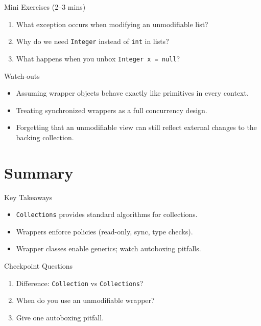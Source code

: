 \documentclass{beamer}
\begin{document}
\begin{frame}{Mini Exercises (2--3 mins)}
  \begin{enumerate}[<+->]
    \item What exception occurs when modifying an unmodifiable list?
    \item Why do we need \texttt{Integer} instead of \texttt{int} in lists?
    \item What happens when you unbox \texttt{Integer x = null}?
  \end{enumerate}
  \slidesources{\OOPSUnitVSources}
\end{frame}

\begin{frame}{Watch-outs}
\begin{itemize}[<+->]
  \item Assuming wrapper objects behave exactly like primitives in every context.
  \item Treating synchronized wrappers as a full concurrency design.
  \item Forgetting that an unmodifiable view can still reflect external changes to the backing collection.
\end{itemize}
  \slidesources{\OOPSUnitVSources}
\end{frame}

\section{Summary}
\label{sec:summary}

\begin{frame}{Key Takeaways}
  \begin{itemize}[<+->]
    \item \texttt{Collections} provides standard algorithms for collections.
    \item Wrappers enforce policies (read-only, sync, type checks).
    \item Wrapper classes enable generics; watch autoboxing pitfalls.
  \end{itemize}
  \slidesources{\OOPSUnitVSources}
\end{frame}

\begin{frame}{Checkpoint Questions}
  \begin{enumerate}[<+->]
    \item Difference: \texttt{Collection} vs \texttt{Collections}?
    \item When do you use an unmodifiable wrapper?
    \item Give one autoboxing pitfall.
  \end{enumerate}
  \slidesources{\OOPSUnitVSources}
\end{frame}
\end{document}

